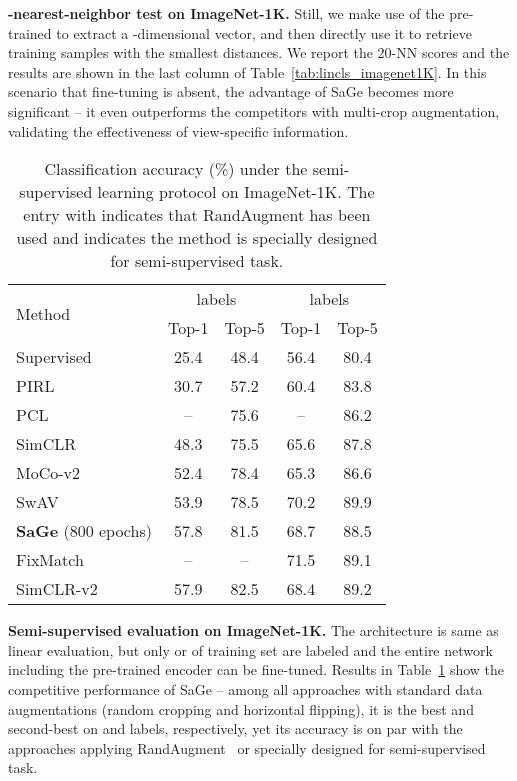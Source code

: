 \documentclass[10pt,twocolumn,letterpaper]{article}
\begin{document}
\vspace{0.1cm}\noindent
\hspace{0.2cm}\textbf{-nearest-neighbor test on ImageNet-1K.} Still, we make use of the pre-trained  to extract a -dimensional vector, and then directly use it to retrieve  training samples with the smallest distances. We report the 20-NN scores and the results are shown in the last column of Table~\ref{tab:lincls_imagenet1K}. In this scenario that fine-tuning is absent, the advantage of SaGe becomes more significant -- it even outperforms the competitors with multi-crop augmentation, validating the effectiveness of view-specific information.

\begin{table}[!t]
\fontsize{9.5}{11.0}\selectfont
\centering
\setlength{\tabcolsep}{2.0mm}
\begin{tabular}{l|cc|cc}
\toprule
\multirow{2}{*}{Method} & \multicolumn{2}{c|}{ labels} & \multicolumn{2}{c}{ labels} \\
\multicolumn{1}{c|}{}            & Top-1  & Top-5    & Top-1  & Top-5 \\\midrule
Supervised                      & 25.4   & 48.4     & 56.4   & 80.4  \\ \midrule
PIRL~\cite{misra2020self}        & 30.7   & 57.2     & 60.4   & 83.8  \\
PCL~\cite{li2020prototypical}    & --     & 75.6     & --     & 86.2 \\
SimCLR~\cite{chen2020simple}     & 48.3   & 75.5     & 65.6   & 87.8 \\
MoCo-v2~\cite{chen2020improved}  & 52.4   & 78.4     & 65.3   & 86.6 \\
SwAV\cite{caron2020unsupervised} & 53.9   & 78.5     & 70.2   & 89.9  \\
\midrule
\textbf{SaGe} (800 epochs)  &57.8   &81.5     &68.7   &88.5   \\
\midrule
FixMatch~\cite{sohn2020fixmatch} & --     & --       & 71.5   & 89.1  \\
SimCLR-v2\cite{chen2020big}      & 57.9   & 82.5     & 68.4   & 89.2 \\
\bottomrule
\end{tabular}
\caption{Classification accuracy (\%) under the semi-supervised learning protocol on ImageNet-1K. The entry with  indicates that RandAugment has been used and  indicates the method is specially designed for semi-supervised task.}
\label{tab:semi_imagenet}
\end{table}

\vspace{0.1cm}\noindent
\hspace{0.2cm}\textbf{Semi-supervised evaluation on ImageNet-1K.} The architecture is same as linear evaluation, but only  or  of training set are labeled and the entire network including the pre-trained encoder can be fine-tuned. Results in Table~\ref{tab:semi_imagenet} show the competitive performance of SaGe -- among all approaches with standard data augmentations (random cropping and horizontal flipping), it is the best and second-best on  and  labels, respectively, yet its accuracy is on par with the approaches applying RandAugment~\cite{RandAugmentation} or specially designed for semi-supervised task.
\end{document}
